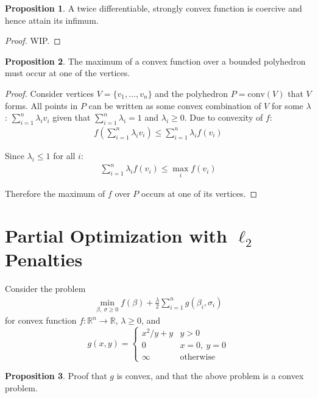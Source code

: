 \documentclass[12pt]{article}
\newcommand{\RR}{\mathbb{R}}
\newcommand{\conv}{\text{conv}}
\theoremstyle{definition}
\newtheorem{prop}{Proposition}[section]
\begin{document}
	\begin{prop}
		A twice differentiable, strongly convex function is coercive and hence attain its infimum.
	\end{prop}
	
	\begin{proof}
		WIP.
	\end{proof}
	
	\begin{prop}
		The maximum of a convex function over a bounded polyhedron must occur at one of the vertices.
	\end{prop}
	
	\begin{proof}
		Consider vertices $V = \{v_1, \dots, v_n\}$ and the polyhedron $P = \conv(V)$ that $V$ forms. All points in $P$ can be written as some convex combination of $V$ for some $\lambda$: $\sum^n_{i=1} \lambda_i v_i$ given that $\sum^n_{i = 1} \lambda_i = 1$ and $\lambda_i \geq 0$. Due to convexity of $f$:
		\begin{gather*}
			f(\sum^n_{i=1} \lambda_i v_i) \leq \sum^n_{i=1} \lambda_i f(v_i)
		\end{gather*}
		
		Since $\lambda_i \leq 1$ for all $i$:
		\begin{gather*}
			\sum^n_{i=1} \lambda_i f(v_i) \leq \max_i f(v_i)
		\end{gather*}
		
		Therefore the maximum of $f$ over $P$ occurs at one of its vertices.
	\end{proof}
	
	\section{Partial Optimization with $\ell_2$ Penalties}
	
	Consider the problem
	\begin{gather*}
		\min_{\beta,\ \sigma \geq 0} f(\beta) + \frac{\lambda}{2}\sum_{i=1}^{n} g(\beta_i, \sigma_i)
	\end{gather*}
	for convex function $f: \RR^n \to \RR$, $\lambda \geq 0$, and
	\[
	g(x, y) =
	\begin{cases}
		x^2/y + y & y > 0 \\
		0 & x = 0,\ y = 0 \\
		\infty & \text{otherwise}
	\end{cases}
	\]
	
	\begin{prop}
		Proof that $g$ is convex, and that the above problem is a convex problem.
	\end{prop}
	
\end{document}
